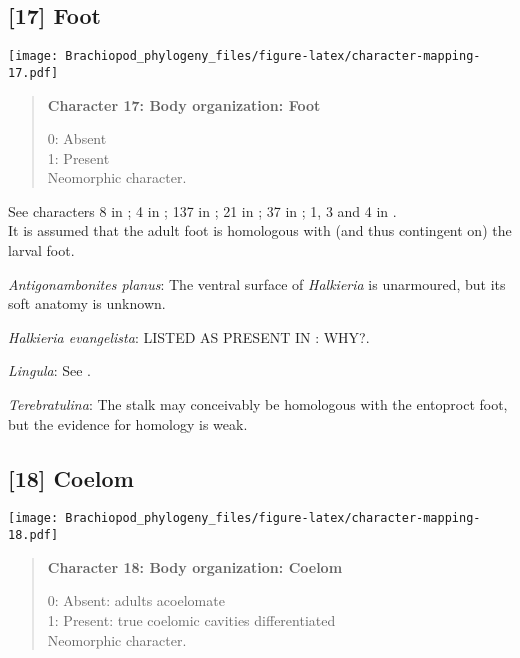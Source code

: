 \documentclass[openany]{book}
\theoremstyle{definition}
\theoremstyle{definition}
\theoremstyle{definition}
\theoremstyle{remark}
\begin{document}
\subsection*{{[}17{]} Foot}\label{foot}

\texttt{[image: Brachiopod\_phylogeny\_files/figure-latex/character-mapping-17.pdf]}

\begin{quote}
\textbf{Character 17: Body organization: Foot}

0: Absent\\
1: Present\\
Neomorphic character.
\end{quote}

See characters 8 in \citet{Haszprunar1996}; 4 in \citet{Vinther2008};
137 in \citet{Rouse1999}; 21 in \citet{BucklandNicks2008}; 37 in
\citet{Sutton2012}; 1, 3 and 4 in \citet{Haszprunar2008}.\\
It is assumed that the adult foot is homologous with (and thus
contingent on) the larval foot.

\hypertarget{Antigonambonites_planus-coding-17}{}
\emph{Antigonambonites planus}: The ventral surface of \emph{Halkieria}
is unarmoured, but its soft anatomy is unknown.

\hypertarget{Halkieria_evangelista-coding-17}{}
\emph{Halkieria evangelista}: LISTED AS PRESENT IN \citet{Smith2012}:
WHY?.

\hypertarget{Lingula-coding-17}{}
\emph{Lingula}: See \citet{Haszprunar2008}.

\hypertarget{Terebratulina-coding-17}{}
\emph{Terebratulina}: The stalk may conceivably be homologous with the
entoproct foot, but the evidence for homology is weak.

\subsection*{{[}18{]} Coelom}\label{coelom}

\texttt{[image: Brachiopod\_phylogeny\_files/figure-latex/character-mapping-18.pdf]}

\begin{quote}
\textbf{Character 18: Body organization: Coelom}

0: Absent: adults acoelomate\\
1: Present: true coelomic cavities differentiated\\
Neomorphic character.
\end{quote}
\end{document}
